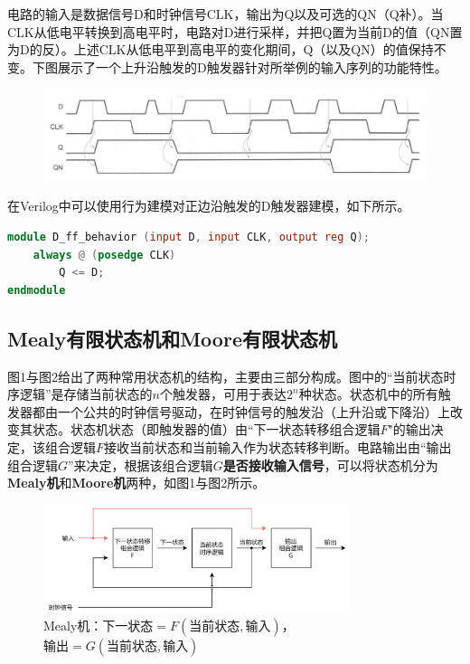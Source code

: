 \documentclass{ctexart}
\begin{document}
电路的输入是数据信号D和时钟信号CLK，输出为Q以及可选的QN（Q补）。当CLK从低电平转换到高电平时，电路对D进行采样，并把Q置为当前D的值（QN置为D的反）。上述CLK从低电平到高电平的变化期间，Q（以及QN）的值保持不变。下图展示了一个上升沿触发的D触发器针对所举例的输入序列的功能特性。

\begin{figure}[H]
    \centering
    \includegraphics[width=\textwidth]{lab2/2.png}
\end{figure}

在Verilog中可以使用行为建模对正边沿触发的D触发器建模，如下所示。

\begin{lstlisting}[language=Verilog]
module D_ff_behavior (input D, input CLK, output reg Q); 
    always @ (posedge CLK)
        Q <= D;
endmodule
\end{lstlisting}

\subsection{Mealy有限状态机和Moore有限状态机}

图1与图2给出了两种常用状态机的结构，主要由三部分构成。图中的“当前状态时序逻辑”是存储当前状态的$n$个触发器，可用于表达$2^n$种状态。状态机中的所有触发器都由一个公共的时钟信号驱动，在时钟信号的触发沿（上升沿或下降沿）上改变其状态。状态机状态（即触发器的值）由“下一状态转移组合逻辑$F$"的输出决定，该组合逻辑$F$接收当前状态和当前输入作为状态转移判断。电路输出由“输出组合逻辑$G$”来决定，根据该组合逻辑$G$\textbf{是否接收输入信号}，可以将状态机分为\textbf{Mealy机}和\textbf{Moore机}两种，如图1与图2所示。

\begin{figure}[H]
    \centering
    \includegraphics[width=0.8\textwidth]{lab2/3.png}
    \caption{Mealy机：$下一状态=F(当前状态,输入)$，$输出=G(当前状态,输入)$}
\end{figure}
\end{document}
